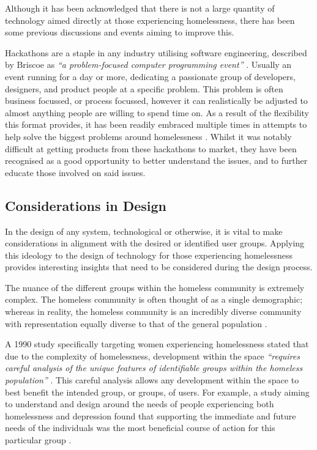 Although it has been acknowledged that there is not a large quantity of technology aimed directly at those experiencing homelessness, there has been some previous discussions and events aiming to improve this.

Hackathons are a staple in any industry utilising software engineering, described by Briscoe as \emph{“a problem-focused computer programming event”} \cite{briscoe2014digital}. Usually an event running for a day or more, dedicating a passionate group of developers, designers, and product people at a specific problem. This problem is often business focussed, or process focussed, however it can realistically be adjusted to almost anything people are willing to spend time on. As a result of the flexibility this format provides, it has been readily embraced multiple times in attempts to help solve the biggest problems around homelessness \cite{wilson2019beyond} \cite{linnell2014hack} \cite{pogavcar2016urban}. Whilst it was notably difficult at getting products from these hackathons to market, they have been recognised as a good opportunity to better understand the issues, and to further educate those involved on said issues.

\subsection{Considerations in Design}

In the design of any system, technological or otherwise, it is vital to make considerations in alignment with the desired or identified user groups. Applying this ideology to the design of technology for those experiencing homelessness provides interesting insights that need to be considered during the design process.

The nuance of the different groups within the homeless community is extremely complex. The homeless community is often thought of as a single demographic; whereas in reality, the homeless community is an incredibly diverse community with representation equally diverse to that of the general population \cite{abs2016census}.

A 1990 study specifically targeting women experiencing homelessness stated that due to the complexity of homelessness, development within the space \emph{“requires careful analysis of the unique features of identifiable groups within the homeless population”} \cite{hagen1990designing}. This careful analysis allows any development within the space to best benefit the intended group, or groups, of users. For example, a study aiming to understand and design around the needs of people experiencing both homelessness and depression found that supporting the immediate and future needs of the individuals was the most beneficial course of action for this particular group \cite{belcher1990needs}.

